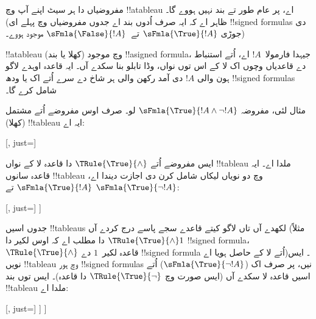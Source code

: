 \documentclass[../../../include/open-logic-section]{subfiles}
\begin{document}
\begin{ex}
  مفروضیاں دا ہر سیٹ اپنے آپ وچ !!a{tableau} اے، پر عام طور تے
  بند نہیں ہووے گا۔ (ظاہر اے کہ ایہ صرف اُدوں بند اے جدوں مفروضیاں
  وچ پہلے ای !!{signed formula}s دی جوڑی
  $\sFmla{\True}{!A}$ تے~$\sFmla{\False}{!A}$ موجود ہووے۔)

  !!a{tableau} (کھلا یا بند) وچ موجود !!a{signed formula}، جیہدا
  فارمولا~$!A$ اے، اُتے استنباط دے قاعدیاں وچوں اک لا کے اس توں
  نواں، وڈا تابلو بنا سکدے آں۔ ایہ قاعدہ اوہدے لاگو ہون والی
  $!A$ دی آمد رکھن والی ہر شاخ دے سرے اُتے اک یا ودھ
  !!{signed formula}s شامل کرے گا۔

  مثال لئی، مفروضہ $\sFmla{\True}{!A \land \lnot
    !A}$ لو۔ صرف اوس مفروضے اُتے مشتمل (کھلا) !!{tableau} ایہ اے:
  \begin{center}
    \begin{tableau}{}
      [, just=\TAss]
    \end{tableau}{}
  \end{center}
  ایس مفروضے اُتے $\TRule{\True}{\land}$ دا قاعدہ لا کے نواں
  !!{tableau} ملدا اے۔ ایہ قاعدہ سانوں !!{tableau} وچ دو نویاں
  لیکاں شامل کرن دی اجازت دیندا اے، $\sFmla{\True}{!A}$ تے
  $\sFmla{\True}{\lnot !A}$:
  \begin{center}
    \begin{tableau}{}
      [, just=\TAss
        [\sFmla{\True}{\formula{A}}, just={\TRule{\True}{\land}[1]},
          [\sFmla{\True}{\lnot \formula{A}}, just={\TRule{\True}{\land}[1]}
          ]
        ]
      ]
    \end{tableau}{}
  \end{center}
  جدوں اسیں !!{tableau}s لکھدے آں تاں لاگو کیتے قاعدے سجے پاسے
  درج کردے آں (مثلاً $\TRule{\True}{\land} 1$ دا مطلب اے کہ
  اوس لکیر دا !!{signed formula}، $\TRule{\True}{\land}$ قاعدہ
  لکیر~$1$ دے !!{signed formula} اُتے لا کے
  حاصل ہویا اے)۔ ایس نویں !!{tableau} وچ ہور
  !!{signed formula}s نیں، پر صرف اک
  ($\sFmla{\True}{\lnot !A}$) اُتے اسیں قاعدہ لا سکدے آں
  (ایس صورت وچ $\TRule{\True}{\lnot}$ دا قاعدہ)۔ ایس توں بند
  !!{tableau} ملدا اے:
  \begin{center}
    \begin{tableau}{}
      [, just=\TAss
        [\sFmla{\True}{\formula{A}}, just={\TRule{\True}{\land}[1]}
          [\sFmla{\True}{\lnot \formula{A}}, just={\TRule{\True}{\land}[1]}
            [\sFmla{\False}{\formula{A}}, just={\TRule{\True}{\lnot}[3]}, close]
          ]
        ]
      ]
    \end{tableau}{}
  \end{center}
\end{ex}
\end{document}
